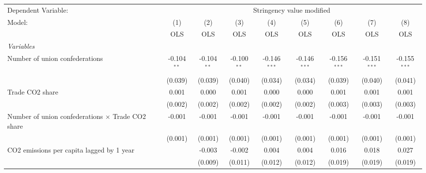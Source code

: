 
\begingroup
\centering
\begin{tabular}{lcccccccc}
   \toprule
   Dependent Variable: & \multicolumn{8}{c}{Stringency value modified}\\
   Model:                                                    & (1)           & (2)           & (3)           & (4)            & (5)            & (6)            & (7)            & (8)\\  
                                                             &  OLS          & OLS           & OLS           & OLS            & OLS            & OLS            & OLS            & OLS\\  
   \midrule
   \emph{Variables}\\
   Number of union confederations                            & -0.104$^{**}$ & -0.104$^{**}$ & -0.100$^{**}$ & -0.146$^{***}$ & -0.146$^{***}$ & -0.156$^{***}$ & -0.151$^{***}$ & -0.155$^{***}$\\   
                                                             & (0.039)       & (0.039)       & (0.040)       & (0.034)        & (0.034)        & (0.039)        & (0.040)        & (0.041)\\   
   Trade CO2 share                                           & 0.001         & 0.000         & 0.001         & 0.000          & 0.000          & 0.001          & 0.001          & 0.001\\   
                                                             & (0.002)       & (0.002)       & (0.002)       & (0.002)        & (0.002)        & (0.003)        & (0.003)        & (0.003)\\   
   Number of union confederations $\times$ Trade CO2 share   & -0.001        & -0.001        & -0.001        & -0.001         & -0.001         & -0.001         & -0.001         & -0.001\\   
                                                             & (0.001)       & (0.001)       & (0.001)       & (0.001)        & (0.001)        & (0.001)        & (0.001)        & (0.001)\\   
   CO2 emissions per capita lagged by 1 year                 &               & -0.003        & -0.002        & 0.004          & 0.004          & 0.016          & 0.018          & 0.027\\   
                                                             &               & (0.009)       & (0.011)       & (0.012)        & (0.012)        & (0.019)        & (0.019)        & (0.019)\\   

\end{tabular}
